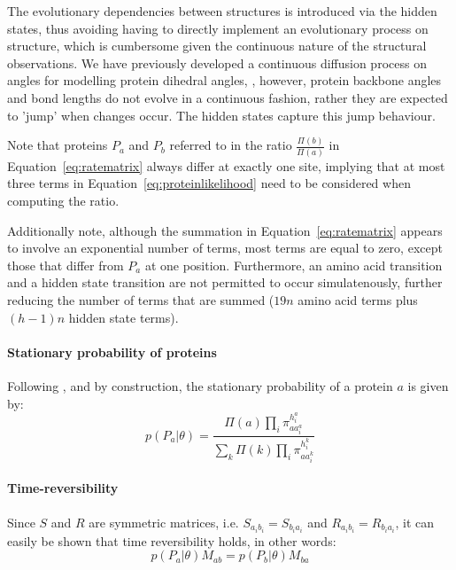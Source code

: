\documentclass[nogrid]{MBE}%
\begin{document}
The evolutionary dependencies between structures is introduced via the hidden states, thus avoiding having to directly implement an evolutionary process on structure, which is cumbersome given the continuous nature of the structural observations. We have previously developed a continuous diffusion process on angles for modelling protein dihedral angles, \citep{Garcia-Portugues:ads, Golden2017}, however,  protein backbone angles and bond lengths do not evolve in a continuous fashion, rather they are expected to 'jump' when changes occur. The hidden states capture this jump behaviour.
 
Note that proteins $P_a$ and $P_b$ referred to in the ratio $\frac{\Pi(b)}{\Pi(a)}$ in Equation~\ref{eq:ratematrix} always differ at exactly one site, implying that at most three terms in Equation~\ref{eq:proteinlikelihood} need to be considered when computing the ratio. 

Additionally note, although the summation in Equation~\ref{eq:ratematrix} appears to involve an exponential number of terms, most terms are equal to zero, except those that differ from $P_a$ at one position. Furthermore, an amino acid transition and a hidden state transition are not permitted to occur simulatenously, further reducing the number of terms that are summed ($19n$ amino acid terms plus $(h-1)n$ hidden state terms).


\paragraph{Stationary probability of proteins}
Following \citet{choi2008basing}, and by construction, the stationary probability of a protein $a$ is given by:
\begin{equation}
\label{eq:stationary_dist}
p(P_a|\theta) = \frac{ \Pi(a) \underset{i}{\prod}\pi^{h^{a}_{i}}_{aa^{a}_{i}} }{ \sum_{k} \Pi(k) \underset{i}{\prod}\pi^{h^{k}_{i}}_{aa^{k}_{i}} } 
\end{equation}


\paragraph{Time-reversibility}
Since $S$ and $R$ are symmetric matrices, i.e. $S_{a_{i}b_{i}}=S_{b_{i}a_{i}}$ and $R_{a_{i}b_{i}}=R_{b_{i}a_{i}}$, it can easily be shown that time reversibility holds, in other words:
\begin{equation}
p(P_a|\theta)M_{ab} = p(P_b|\theta)M_{ba}
\end{equation}
\end{document}
